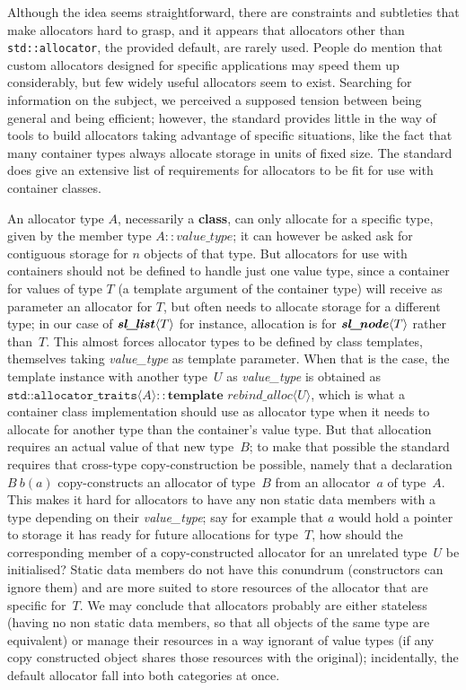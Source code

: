 \documentclass[12pt]{article}
\theoremstyle{plain}
\theoremstyle{definition}
\newcommand\std[1]{\texttt{std::#1}}
\def\slnd.{\textbf{\textit{sl\_\!node}}}
\def\slls.{\textbf{\textit{sl\_\!list}}}
\def\ang#1{\langle#1\rangle}
\begin{document}
Although the idea seems straightforward, there are constraints and subtleties
that make allocators hard to grasp, and it appears that allocators other than
\std{allocator}, the provided default, are rarely used. People do mention that
custom allocators designed for specific applications may speed them up
considerably, but few widely useful allocators seem to exist. Searching for
information on the subject, we perceived a supposed tension between being
general and being efficient; however, the standard provides little in the way of
tools to build allocators taking advantage of specific situations, like the fact
that many container types always allocate storage in units of fixed size. The
standard does give an extensive list of requirements for allocators to be fit
for use with container classes.

An allocator type $A$, necessarily a \textbf{class}, can only allocate for a
specific type, given by the member type $A::\textit{value\_type}$; it can
however be asked ask for contiguous storage for $n$ objects of that type. But
allocators for use with containers should not be defined to handle just one
value type, since a container for values of type $T$ (a template argument of the
container type) will receive as parameter an allocator for $T$, but often needs
to allocate storage for a different type; in our case of $\slls.\ang T$ for
instance, allocation is for $\slnd.\ang T$ rather than~$T$. This almost forces
allocator types to be defined by class templates, themselves taking
\textit{value\_type} as template parameter. When that is the case, the template
instance with another type~$U$ as \textit{value\_type} is obtained as
$\std{allocator\_traits}\ang A::\textbf{template }\textit{rebind\_alloc}\ang U$,
which is what a container class implementation should use as allocator type when
it needs to allocate for another type than the container's value type. But that
allocation requires an actual value of that new type~$B$; to make that possible
the standard requires that cross-type copy-construction be possible, namely that
a declaration $B~b(a)$ copy-constructs an allocator of type~$B$ from an
allocator~$a$ of type~$A$. This makes it hard for allocators to have any non
static data members with a type depending on their \textit{value\_type}; say for
example that $a$ would hold a pointer to storage it has ready for future
allocations for type~$T$, how should the corresponding member of a
copy-constructed allocator for an unrelated type~$U$ be initialised? Static data
members do not have this conundrum (constructors can ignore them) and are more
suited to store resources of the allocator that are specific for~$T$. We may
conclude that allocators probably are either stateless (having no non static
data members, so that all objects of the same type are equivalent) or manage
their resources in a way ignorant of value types (if any copy constructed object
shares those resources with the original); incidentally, the default allocator
fall into both categories at once.
\end{document}
